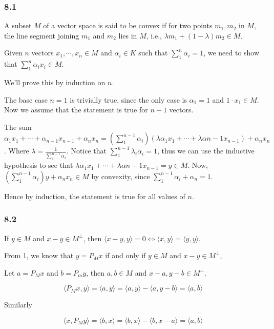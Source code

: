 \documentclass[11pt]{article}
\begin{document}
\subsubsection{8.1}
\label{sec:orgbe29c76}
A subset \(M\) of a vector space is said to be convex if for two points \(m_1,
    m_2\) in \(M\), the line segment joining \(m_1\) and \(m_2\) lies in \(M\), i.e.,
\(\lambda m_1 + (1-\lambda)m_2 \in M\).

Given \(n\) vectors \(x_1, \cdots, x_n\in M\) and \(\alpha_i \in K\) such that
\(\sum_1^n \alpha_i = 1\), we need to show that \(\sum_1^n \alpha_i x_i \in M\).

We'll prove this by induction on \(n\).

The base case \(n=1\) is trivially true, since the only case is \(\alpha_1 = 1\)
and \(1\cdot x_1 \in M\). Now we assume that the statement is true for \(n-1\)
vectors.

The sum \(\alpha_1x_1 + \cdots + \alpha_{n-1}x_{n-1} + \alpha_nx_n=
    (\sum_1^{n-1}\alpha_i)(\lambda\alpha_1 x_1 + \cdots +
    \lambda\alpha{n-1}x_{n-1}) + \alpha_n x_n\). Where \(\lambda =
    \frac{1}{\sum_1^{n-1} \alpha_i}\). Notice that \(\sum_1^{n-1} \lambda_i
    \alpha_i = 1\), thus we can use the inductive hypothesis to see that
\(\lambda\alpha_1 x_1 + \cdots + \lambda\alpha{n-1}x_{n-1} = y \in M\). Now,
\((\sum_1^{n-1}\alpha_i)y + \alpha_n x_n \in M\) by convexity, since
\(\sum_1^{n-1}\alpha_i + \alpha_n = 1\).

Hence by induction, the statement is true for all values of \(n\).
\subsubsection{8.2}
\label{sec:orgb999c02}
If \(y \in M\) and \(x - y \in M^{\perp}\), then \(\langle x - y, y \rangle = 0
    \iff \langle x, y \rangle = \langle y, y \rangle\).

From 1, we know that \(y = P_Mx\) if and only if \(y \in M\) and \(x - y \in
    M^\perp\),

Let \(a = P_M x\) and \(b = P_m y\), then \(a, b \in M\) and \(x-a, y-b \in
    M^\perp\).

$$\langle P_M x, y \rangle = \langle a, y \rangle = \langle a, y \rangle - \langle a, y - b \rangle =
    \langle a, b\rangle$$

Similarly

$$\langle x, P_M y \rangle = \langle b, x \rangle = \langle b, x \rangle - \langle b, x - a \rangle =
    \langle a, b\rangle$$
\end{document}
